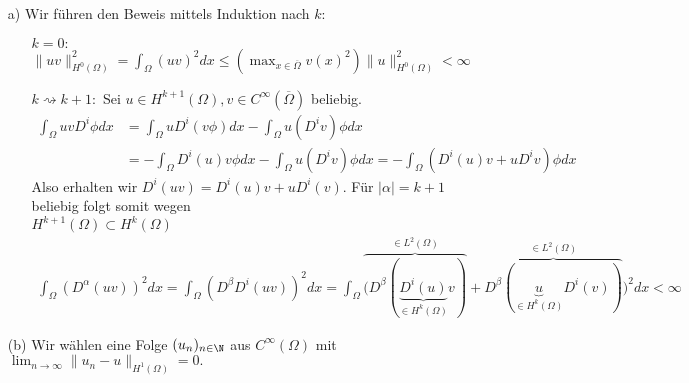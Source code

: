 \begin{solution}

\begin{itemize}
  \item[a)] Wir führen den Beweis mittels Induktion nach $k$:
  \begin{itemize}
    \item[$k = 0:$] $\|uv\|_{H^0(\Omega)}^2 = \int_\Omega (uv)^2 dx \leq
    \left(\max_{x \in \overline{\Omega}}v(x)^2\right) \|u\|_{H^0(\Omega)}^2 < \infty$
    \item[$k \rightsquigarrow k+1:$] Sei $u \in H^{k+1}(\Omega), v \in C^{\infty}(\overline{\Omega})$
    beliebig.
    \begin{align*}
      \int_\Omega uvD^i\phi dx &= \int_\Omega u D^i(v\phi)dx  - \int_\Omega u(D^i v)\phi dx \\
      &= -\int_\Omega D^i(u)v\phi dx - \int_\Omega u(D^iv)\phi dx
      = -\int_\Omega (D^i(u)v + uD^iv)\phi dx
    \end{align*}
    Also erhalten wir $D^i(uv) = D^i(u)v + uD^i(v)$. Für $|\alpha| = k + 1$ beliebig
    folgt somit wegen \\
    $H^{k+1}(\Omega) \subset H^k(\Omega)$
    \begin{align*}
      \int_\Omega (D^{\alpha}(uv))^2 dx = \int_\Omega (D^\beta D^i (uv))^2 dx
    = \int_\Omega \overbrace{(D^\beta(\underbrace{D^i(u)}_{\in H^k(\Omega)}v)}^{\in L^2(\Omega)}
      + \overbrace{D^\beta(\underbrace{u}_{\in H^k(\Omega)}D^i(v))}^{\in L^2(\Omega)})^2 dx < \infty
    \end{align*}
  \end{itemize}
  \item[(b)] Wir wählen eine Folge $(u_n)_{n \in \N}$ aus $C^\infty(\Omega)$ mit $\lim_{n \rightarrow \infty} \|u_n - u\|_{H^1(\Omega)} = 0.$


\end{itemize}
\end{solution}

